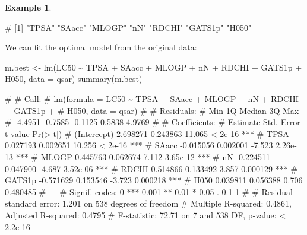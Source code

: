 \documentclass[
  a4paper,
]{article}
\newenvironment{Shaded}{\begin{snugshade}}{\end{snugshade}}
\newcommand{\AttributeTok}[1]{\textcolor[rgb]{0.77,0.63,0.00}{#1}}
\newcommand{\FunctionTok}[1]{\textcolor[rgb]{0.00,0.00,0.00}{#1}}
\newcommand{\NormalTok}[1]{#1}
\newcommand{\OtherTok}[1]{\textcolor[rgb]{0.56,0.35,0.01}{#1}}
\newcommand{\SpecialCharTok}[1]{\textcolor[rgb]{0.00,0.00,0.00}{#1}}
\theoremstyle{definition}
\theoremstyle{definition}
\newtheorem{example}{Example}[section]
\theoremstyle{definition}
\theoremstyle{definition}
\theoremstyle{remark}
\begin{document}
\begin{example}
\begin{Shaded}
\begin{Highlighting}[]
\NormalTok{\# [1] "TPSA"   "SAacc"  "MLOGP"  "nN"     "RDCHI"  "GATS1p" "H050"}
\end{Highlighting}
\end{Shaded}

We can fit the optimal model from the original data:

\begin{Shaded}
\begin{Highlighting}[]
\NormalTok{m.best }\OtherTok{\textless{}{-}} \FunctionTok{lm}\NormalTok{(LC50 }\SpecialCharTok{\textasciitilde{}}\NormalTok{ TPSA }\SpecialCharTok{+}\NormalTok{ SAacc }\SpecialCharTok{+}\NormalTok{ MLOGP }\SpecialCharTok{+}\NormalTok{ nN }\SpecialCharTok{+}\NormalTok{ RDCHI }\SpecialCharTok{+}\NormalTok{ GATS1p }\SpecialCharTok{+}\NormalTok{ H050,}
             \AttributeTok{data =}\NormalTok{ qsar)}
\FunctionTok{summary}\NormalTok{(m.best)}
\end{Highlighting}
\end{Shaded}

\begin{Shaded}
\begin{Highlighting}[]
\NormalTok{\# }
\NormalTok{\# Call:}
\NormalTok{\# lm(formula = LC50 \textasciitilde{} TPSA + SAacc + MLOGP + nN + RDCHI + GATS1p + }
\NormalTok{\#     H050, data = qsar)}
\NormalTok{\# }
\NormalTok{\# Residuals:}
\NormalTok{\#     Min      1Q  Median      3Q     Max }
\NormalTok{\# {-}4.4951 {-}0.7585 {-}0.1125  0.5838  4.9769 }
\NormalTok{\# }
\NormalTok{\# Coefficients:}
\NormalTok{\#              Estimate Std. Error t value Pr(\textgreater{}|t|)    }
\NormalTok{\# (Intercept)  2.698271   0.243863  11.065  \textless{} 2e{-}16 ***}
\NormalTok{\# TPSA         0.027193   0.002651  10.256  \textless{} 2e{-}16 ***}
\NormalTok{\# SAacc       {-}0.015056   0.002001  {-}7.523 2.26e{-}13 ***}
\NormalTok{\# MLOGP        0.445763   0.062674   7.112 3.65e{-}12 ***}
\NormalTok{\# nN          {-}0.224511   0.047900  {-}4.687 3.52e{-}06 ***}
\NormalTok{\# RDCHI        0.514866   0.133492   3.857 0.000129 ***}
\NormalTok{\# GATS1p      {-}0.571629   0.153546  {-}3.723 0.000218 ***}
\NormalTok{\# H050         0.039811   0.056388   0.706 0.480485    }
\NormalTok{\# {-}{-}{-}}
\NormalTok{\# Signif. codes:  0 \textquotesingle{}***\textquotesingle{} 0.001 \textquotesingle{}**\textquotesingle{} 0.01 \textquotesingle{}*\textquotesingle{} 0.05 \textquotesingle{}.\textquotesingle{} 0.1 \textquotesingle{} \textquotesingle{} 1}
\NormalTok{\# }
\NormalTok{\# Residual standard error: 1.201 on 538 degrees of freedom}
\NormalTok{\# Multiple R{-}squared:  0.4861,  Adjusted R{-}squared:  0.4795 }
\NormalTok{\# F{-}statistic: 72.71 on 7 and 538 DF,  p{-}value: \textless{} 2.2e{-}16}
\end{Highlighting}
\end{Shaded}


\end{example}
\end{document}
